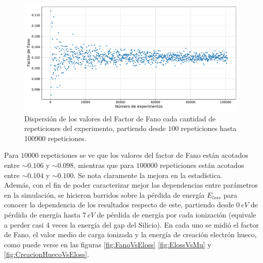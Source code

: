 \begin{figure}%
    \centering
    \includegraphics[scale=0.5]{Figs/FanoConvergencia.pdf}
    \caption{\footnotesize{Dispersión de los valores del Factor de Fano cada cantidad de repeticiones del experimento, partiendo desde $100$ repeticiones hasta 100900 repeticiones.}}
    \label{fig:FanoConvergencia}
\end{figure}
Para $10000$ repeticiones se ve que los valores del factor de Fano están acotados entre $\sim 0.106$ y $\sim 0.098$, mientras que para $100000$ repeticiones están acotados entre $\sim 0.104$ y $\sim 0.100$. Se nota claramente la mejora en la estadística.\\
\indent Además, con el fin de poder caracterizar mejor las dependencias entre parámetros en la simulación, se hicieron barridos sobre la pérdida de energía $E_{loss}$ para conocer la dependencia de los resultados respecto de este, partiendo desde $0\,\si{eV}$ de pérdida de energía hasta $7\,\si{eV}$ de pérdida de energía por cada ionización (equivale a perder casi $4$ veces la energía del gap del Silicio). En cada uno se midió el factor de Fano, el valor medio de carga ionizada y la energía de creación electrón hueco, como puede verse en las figuras \ref{fig:FanoVsEloss} \ref{fig:ElossVsMu} y \ref{fig:CreacionHuecoVsEloss}. 
